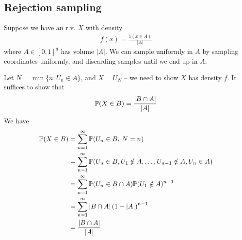 \documentclass{../../template/note}
\begin{document}
    \subsection{Rejection sampling}

    Suppose we have an r.v. \(X\) with density
    \begin{align*}
        f(x) = \frac{1(x \in A)}{|A|}
    \end{align*}
    where \(A \in [0,1]^d\) has volume \(|A|\). We can sample uniformly in \(A\) by sampling coordinates uniformly, and discarding samples until we end up in \(A\).

    Let \(N = \min\{n: U_n \in A\}\), and \(X = U_N\) -- we need to show \(X\) has density \(f\). It suffices to show that
    \begin{align*}
        \mathbb P(X \in B) = \frac{|B \cap A|}{|A|}
    \end{align*}
    We have
    \begin{align*}
        \mathbb P(X \in B) &= \sum_{n=1}^\infty \mathbb P(U_n \in B,\, N = n) \\
        &= \sum_{n=1}^\infty \mathbb P(U_n \in B, U_1 \notin A, \dots, U_{n-1} \notin A, U_n \in A) \\
        &= \sum_{n=1}^\infty \mathbb P(U_n \in B \cap A) \mathbb P(U_1 \notin A)^{n-1} \\
        &= \sum_{n=1}^\infty |B \cap A| \left(1-|A|\right)^{n-1} \\
        &= \frac{|B \cap A|}{|A|}
    \end{align*}
    
    
    
    
     
    
    
    
    
    
    
\end{document}
